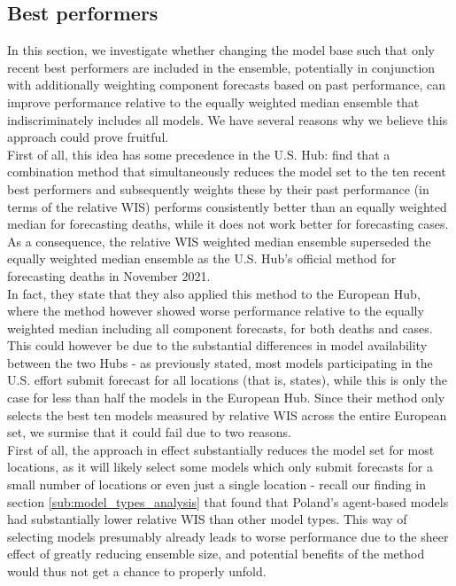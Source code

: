 \subsection{Best performers}
In this section, we investigate whether changing the model base such that only recent best performers are included in the ensemble, potentially in conjunction with additionally weighting component forecasts based on past performance, can improve performance relative to the equally weighted median ensemble that indiscriminately includes all models. We have several reasons why we believe this approach could prove fruitful. \medskip\\
First of all, this idea has some precedence in the U.S. Hub: \cite{ray_comparing_2022} find that a combination method that simultaneously reduces the model set to the ten recent best performers and subsequently weights these by their past performance (in terms of the relative WIS) performs consistently better than an equally weighted median for forecasting deaths, while it does not work better for forecasting cases. As a consequence, the relative WIS weighted median ensemble superseded the equally weighted median ensemble as the U.S. Hub's official method for forecasting deaths in November 2021.\\ 
In fact, they state that they also applied this method to the European Hub, where the method however showed worse performance relative to the equally weighted median including all component forecasts, for both deaths and cases. This could however be due to the substantial differences in model availability between the two Hubs - as previously stated, most models participating in the U.S. effort submit forecast for all locations (that is, states), while this is only the case for less than half the models in the European Hub. Since their method only selects the best ten models measured by relative WIS across the entire European set, we surmise that it could fail due to two reasons.\\
First of all, the approach in effect substantially reduces the model set for most locations, as it will likely select some models which only submit forecasts for a small number of locations or even just a single location - recall our finding in section \ref{sub:model_types_analysis} that found that Poland's agent-based models had substantially lower relative WIS than other model types. This way of selecting models presumably already leads to worse performance due to the sheer effect of greatly reducing ensemble size, and potential benefits of the method would thus not get a chance to properly unfold.\\
